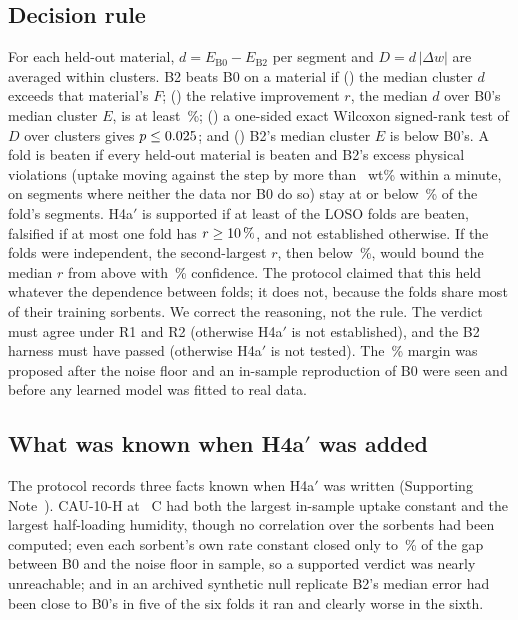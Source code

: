 \documentclass[12pt]{article}
\begin{document}
\subsection{Decision rule}

For each held-out material, $d = E_{\mathrm{B0}} - E_{\mathrm{B2}}$ per segment and $D = d\,|\Delta w|$ are averaged
within clusters. B2 beats B0 on a material if () the median cluster $d$ exceeds that material's $F$; () the
relative improvement $r$, the median $d$ over B0's median cluster $E$, is at least \,\%; () a
one-sided exact Wilcoxon signed-rank test of $D$ over clusters gives $p \le \V{alpha}{0.025}$; and () B2's median
cluster $E$
is below B0's. A fold is beaten if every held-out material is beaten and B2's excess physical violations (uptake
moving against the step by more than ~wt\% within a minute, on segments where neither the data nor B0
do so) stay at or below \,\% of the fold's segments. H4a$'$ is supported if at least
 of the  LOSO folds are beaten, falsified if at most one fold has $r \ge \V{margin2}{10}\,\%$,
and not established otherwise. If the folds were independent, the second-largest $r$, then below \,\%,
would bound the median $r$ from above with \,\% confidence. The protocol claimed that this held whatever
the dependence between folds; it does not, because the folds share most of their training sorbents. We correct the
reasoning, not the rule. The verdict must agree under R1 and R2 (otherwise H4a$'$ is not established), and the
B2 harness must have passed (otherwise H4a$'$ is not tested). The \,\% margin was proposed after the noise floor and an in-sample reproduction of B0 were
seen and before any learned model was fitted to real data.

\subsection{What was known when \texorpdfstring{H4a$'$}{H4a'} was added}

The protocol records three facts known when H4a$'$ was written (Supporting Note~). CAU-10-H at
~\textdegree C had both the largest in-sample uptake constant and the largest half-loading humidity,
though no correlation over the sorbents had been computed; even each sorbent's own rate constant closed only
 to \,\% of the gap between B0 and the noise floor in sample, so a supported verdict was
nearly unreachable; and in an archived synthetic null replicate B2's median error had been close to B0's in five of the six folds it
ran and clearly worse in the sixth.
\end{document}
